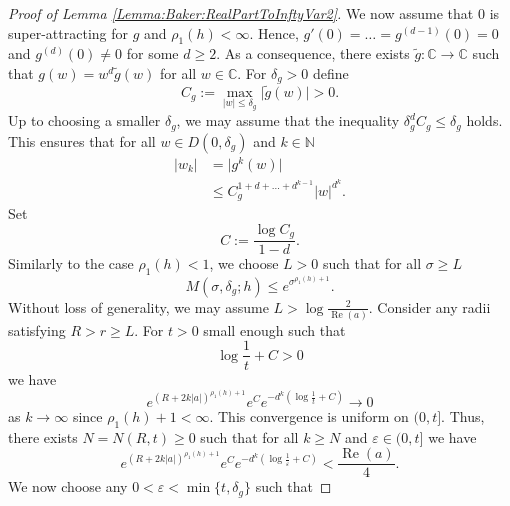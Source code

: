 \documentclass[a4paper, 12pt, twoside]{amsart}
\theoremstyle{definition}
\numberwithin{equation}{section}
\renewcommand{\Re}{\operatorname{Re}}
\begin{document}
\begin{proof}[Proof of Lemma {\ref{Lemma:Baker:RealPartToInftyVar2}}]
	We now assume that $0$ is super-attracting for $g$ and $\rho_1(h) < \infty$. Hence, $g'(0) = \dots = g^{(d-1)}(0) = 0$ and $g^{(d)}(0) \neq 0$ for some $d \geq 2$. 
	As a consequence, there exists $\widetilde{g} : \mathbb{C} \to \mathbb{C}$ such that $g(w) = w^d \widetilde{g}(w)$ for all $w \in \mathbb{C}$. For $\delta_g > 0$ define
	\begin{equation*}
		C_g := \max_{\lvert w \rvert \leq \delta_g} \lvert \widetilde{g}(w) \rvert > 0.
	\end{equation*}
	Up to choosing a smaller $\delta_g$, we may assume that the inequality $\delta_g^d C_g \leq \delta_g$ holds.
    This ensures that for all $w \in D(0,\delta_g)$ and $k\in\mathbb{N}$
	\begin{equation}\label{Lemma:Baker:RealPartToInftyVar2:ProofPropIteratesUnderg}
		\begin{split}
			\lvert w_k \rvert &= \lvert g^k(w) \rvert \\
			&\leq C_g^{1 + d + \dots + d^{k-1}} \lvert w \rvert^{d^k}.
		\end{split}
	\end{equation}
	Set
	\begin{equation*}
		C := \frac{\log C_g}{1-d}.
	\end{equation*}
	Similarly to the case $\rho_1(h)<1$, we choose $L > 0$ such that for all $\sigma \geq L$
	\begin{equation*}
		M(\sigma, \delta_g; h) \leq e^{\sigma^{\rho_1(h) + 1}}.
	\end{equation*}
	Without loss of generality, we may assume $L > \log \frac{2}{\Re(a)}$. Consider any radii satisfying $R>r\ge L$. 
	For $t > 0$ small enough such that
	\begin{equation*}
		\log \frac{1}{t} + C > 0
	\end{equation*}
	we have
	\begin{equation*}
		e^{(R + 2k \lvert a \rvert)^{\rho_1(h) + 1}} e^{C}e^{-d^k (\log \frac{1}{t} + C)} \to 0
	\end{equation*}
	as $k \to \infty$ since $\rho_1(h) + 1 < \infty$.
	This convergence is uniform on $(0,t]$. Thus, there exists $N = N(R,t)\ge0$ such that for all $k \geq N$ and $\varepsilon \in (0,t]$ we have
	\begin{equation*}\label{Lemma:Baker:RealPartToInftyVar2:ProofPropN2}
		e^{(R + 2k \lvert a \rvert)^{\rho_1(h) + 1}} e^{C}e^{-d^k (\log \frac{1}{\varepsilon} + C)} < \frac{\Re(a)}{4}.
	\end{equation*}
	We now choose any $0 < \varepsilon < \min\lbrace t, \delta_g \rbrace$ such that

\end{proof}
\end{document}
